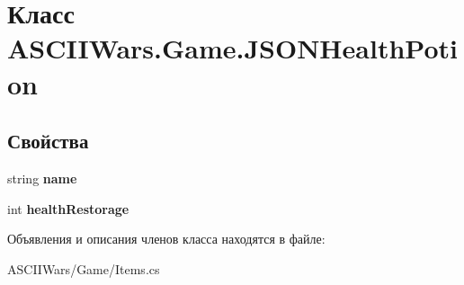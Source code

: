\hypertarget{class_a_s_c_i_i_wars_1_1_game_1_1_j_s_o_n_health_potion}{}\section{Класс A\+S\+C\+I\+I\+Wars.\+Game.\+J\+S\+O\+N\+Health\+Potion}
\label{class_a_s_c_i_i_wars_1_1_game_1_1_j_s_o_n_health_potion}
\subsection*{Свойства}
\begin{DoxyCompactItemize}
\item 
\hypertarget{class_a_s_c_i_i_wars_1_1_game_1_1_j_s_o_n_health_potion_a3f13e907e15e824e4a07fc7ea9260def}{}\label{class_a_s_c_i_i_wars_1_1_game_1_1_j_s_o_n_health_potion_a3f13e907e15e824e4a07fc7ea9260def} 
string {\bfseries name}
\item 
\hypertarget{class_a_s_c_i_i_wars_1_1_game_1_1_j_s_o_n_health_potion_af1294529b5419e6e13cbec52087c8a17}{}\label{class_a_s_c_i_i_wars_1_1_game_1_1_j_s_o_n_health_potion_af1294529b5419e6e13cbec52087c8a17} 
int {\bfseries health\+Restorage}
\end{DoxyCompactItemize}


Объявления и описания членов класса находятся в файле\+:\begin{DoxyCompactItemize}
\item 
A\+S\+C\+I\+I\+Wars/\+Game/Items.\+cs\end{DoxyCompactItemize}
